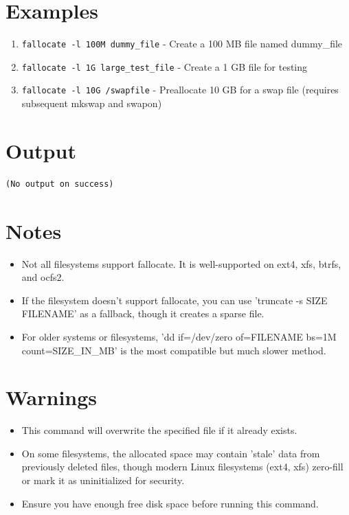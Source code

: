 \documentclass[openany]{book}
\begin{document}
\section*{Examples}
\begin{enumerate}
  \item \texttt{fallocate -l 100M dummy\_file} - Create a 100 MB file named dummy\_file
  \item \texttt{fallocate -l 1G large\_test\_file} - Create a 1 GB file for testing
  \item \texttt{fallocate -l 10G /swapfile} - Preallocate 10 GB for a swap file (requires subsequent mkswap and swapon)
\end{enumerate}

\section*{Output}
\begin{lstlisting}
(No output on success)
\end{lstlisting}

\section*{Notes}
\begin{itemize}
  \item Not all filesystems support fallocate. It is well-supported on ext4, xfs, btrfs, and ocfs2.
  \item If the filesystem doesn't support fallocate, you can use 'truncate -s SIZE FILENAME' as a fallback, though it creates a sparse file.
  \item For older systems or filesystems, 'dd if=/dev/zero of=FILENAME bs=1M count=SIZE\_IN\_MB' is the most compatible but much slower method.
\end{itemize}

\section*{Warnings}
\begin{itemize}
  \item This command will overwrite the specified file if it already exists.
  \item On some filesystems, the allocated space may contain 'stale' data from previously deleted files, though modern Linux filesystems (ext4, xfs) zero-fill or mark it as uninitialized for security.
  \item Ensure you have enough free disk space before running this command.
\end{itemize}
\end{document}
